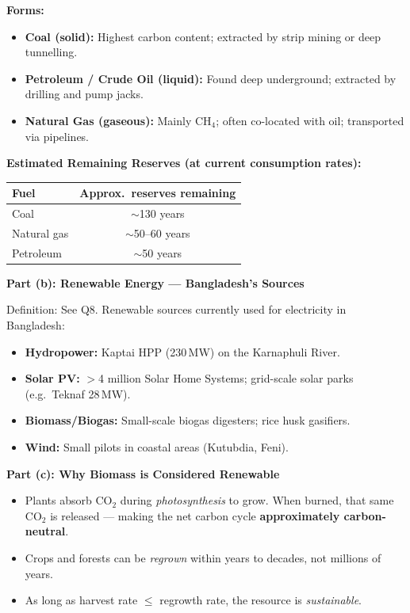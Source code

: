 \documentclass[12pt,a3paper]{article}
\begin{document}
\begin{enumerate}
\begin{tcolorbox}[enhanced,breakable,ansbox,colback=cA!4,colframe=cA,
  boxrule=0.8pt,arc=5pt,
  title={\textbf{Answer}},fonttitle=\bfseries\color{white},colbacktitle=cA]
\textbf{Forms:}
\begin{itemize}[leftmargin=1.5em,itemsep=2pt]
  \item \textbf{Coal (solid):} Highest carbon content; extracted by strip mining or deep tunnelling.
  \item \textbf{Petroleum / Crude Oil (liquid):} Found deep underground; extracted by drilling and pump jacks.
  \item \textbf{Natural Gas (gaseous):} Mainly CH$_4$; often co-located with oil; transported via pipelines.
\end{itemize}

\textbf{Estimated Remaining Reserves (at current consumption rates):}
\begin{center}
\small
\begin{tabular}{@{}lc@{}}
\toprule
\textbf{Fuel} & \textbf{Approx.\ reserves remaining} \\
\midrule
Coal         & $\sim$130 years \\
Natural gas  & $\sim$50--60 years \\
Petroleum    & $\sim$50 years \\
\bottomrule
\end{tabular}
\end{center}

\hrulefill

\textbf{Part (b): Renewable Energy — Bangladesh's Sources}

Definition: See Q8. Renewable sources currently used for electricity in Bangladesh:
\begin{itemize}[leftmargin=1.5em,itemsep=1pt]
  \item \textbf{Hydropower:} Kaptai HPP (230\,MW) on the Karnaphuli River.
  \item \textbf{Solar PV:} $>$4 million Solar Home Systems; grid-scale solar parks (e.g.\ Teknaf 28\,MW).
  \item \textbf{Biomass/Biogas:} Small-scale biogas digesters; rice husk gasifiers.
  \item \textbf{Wind:} Small pilots in coastal areas (Kutubdia, Feni).
\end{itemize}

\hrulefill

\textbf{Part (c): Why Biomass is Considered Renewable}

\begin{itemize}[leftmargin=1.5em,itemsep=2pt]
  \item Plants absorb CO$_2$ during \emph{photosynthesis} to grow. When burned, that same CO$_2$ is released — making the net carbon cycle \textbf{approximately carbon-neutral}.
  \item Crops and forests can be \emph{regrown} within years to decades, not millions of years.
  \item As long as harvest rate $\leq$ regrowth rate, the resource is \emph{sustainable}.
\end{itemize}


\end{tcolorbox}
\end{enumerate}
\end{document}
